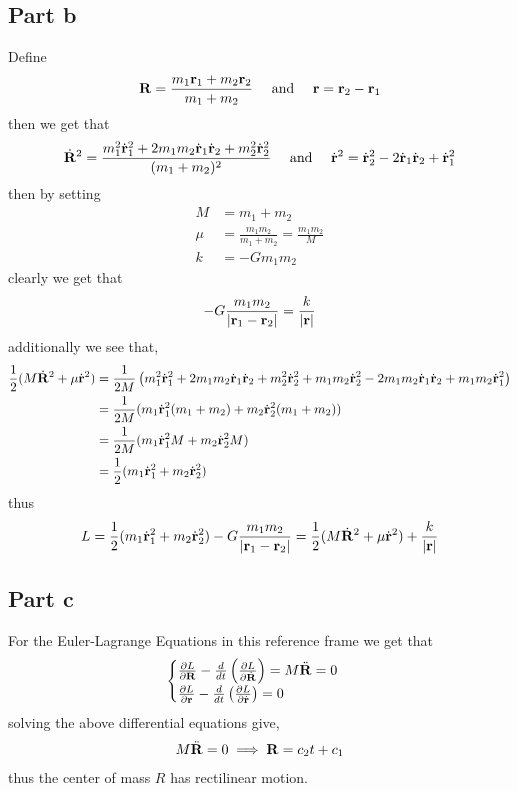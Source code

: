 \documentclass[12pt]{report}
\newcommand{\rb}{\bold{r}}
\begin{document}
\subsection*{Part b}
Define
\begin{equation*}
    \bold{R} = \frac{m_1\rb_1 + m_2\rb_2}{m_1 + m_2} \quad \text{ and } \quad \rb = \rb_2 - \rb_1
\end{equation*}
then we get that 
\begin{align*}
    \dot{\bold{R}}^2 = \frac{m_1^2 \dot{\rb}_1^2 + 2m_1m_2\dot{\rb}_1\dot{\rb}_2 + m_2^2 \dot{\rb}_2^2}{(m_1 + m_2)^2} \quad \text{ and } \quad \dot{\rb}^2 = \dot{\rb}_2^2 - 2\dot{\rb}_1 \dot{\rb}_2 + \dot{\rb}_1^2
\end{align*}
then by setting 
\begin{align*}
    M &= m_1 + m_2 \\
    \mu &= \frac{m_1m_2}{m_1 + m_2} = \frac{m_1m_2}{M} \\
    k &= -Gm_1m_2
\end{align*}
clearly we get that
\begin{equation*}
    -G\frac{m_1m_2}{|\rb_1 - \rb_2|} = \frac{k}{|\rb|}
\end{equation*}
additionally we see that,
\begin{align*}
 \frac{1}{2}(M\dot{\bold{R}}^2 + \mu \dot{\rb}^2) &= \frac{1}{2M} \left(m_1^2 \dot{\rb}_1^2 + 2m_1m_2\dot{\rb}_1\dot{\rb}_2 + m_2^2 \dot{\rb}_2^2 + m_1m_2\dot{\rb}_2^2 - 2m_1m_2\dot{\rb}_1 \dot{\rb}_2 + m_1m_2\dot{\rb}_1^2\right) \\
 &= \frac{1}{2M} (m_1\dot{\rb}_1^2(m_1 + m_2) + m_2\dot{\rb}_2^2(m_1 + m_2)) \\
 &= \frac{1}{2M} (m_1\dot{\rb}_1^2M + m_2\dot{\rb}_2^2M) \\
 &= \frac{1}{2}(m_1\dot{\rb}_1^2 + m_2\dot{\rb}_2^2)
\end{align*}
thus 
\begin{equation*}
    L = \frac{1}{2}(m_1\dot{\rb}_1^2 + m_2\dot{\rb}_2^2) - G\frac{m_1m_2}{|\rb_1 -\rb_2|} =  \frac{1}{2}(M\dot{\bold{R}}^2 + \mu \dot{\rb}^2) + \frac{k}{|\rb|}
\end{equation*}

\subsection*{Part c}
For the Euler-Lagrange Equations in this reference frame we get that
\begin{equation*}
   \begin{cases} \frac{\partial L}{\partial \bold{R}} - \frac{d}{dt}\left(\frac{\partial L}{\partial \dot{\bold{R}}}\right) = M\ddot{\bold{R}} = 0 \\
   \frac{\partial L}{\partial \rb} - \frac{d}{dt}\left(\frac{\partial L}{\partial \dot{\rb}}\right)  = 0 
   \end{cases}
\end{equation*}
solving the above differential equations give,
\begin{align*}
    M\ddot{\bold{R}} &= 0 \implies \bold{R} = c_2t + c_1 \\
\end{align*}
thus the center of mass $R$ has rectilinear motion.
\end{document}
